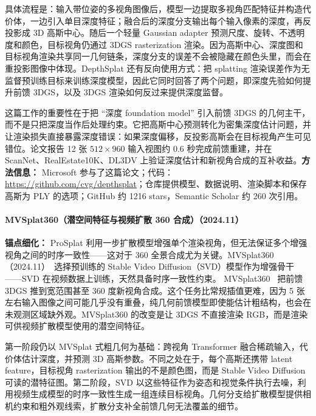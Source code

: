 具体流程是：输入带位姿的多视角图像后，模型一边提取多视角匹配特征并构造代价体，一边引入单目深度特征；融合后的深度分支输出每个输入像素的深度，再反投影成 3D 高斯中心。随后一个轻量 Gaussian adapter 预测尺度、旋转、不透明度和颜色，目标视角仍通过 3DGS rasterization 渲染。因为高斯中心、深度图和目标视角渲染共享同一几何链条，深度分支的误差不会被隐藏在颜色头里，而会在重投影图像中体现。DepthSplat 还有反向使用方式：把 splatting 渲染误差作为无监督预训练目标来训练深度模型，因此它同时回答了两个问题，即深度先验如何提升前馈 3DGS，以及 3DGS 渲染如何反过来提供深度监督。

这篇工作的重要性在于把 ``深度 foundation model'' 引入前馈 3DGS 的几何主干，而不是只把深度当作后处理约束。它把高斯中心预测转化为密集深度估计问题，并让渲染损失直接暴露深度错误：如果深度偏移，反投影高斯会在目标视角产生可见错位。论文报告 12 张 $512\times960$ 输入视图约 0.6 秒完成前馈重建，并在 ScanNet、RealEstate10K、DL3DV 上验证深度估计和新视角合成的互补收益。\textbf{方法信息：} Microsoft 参与了这篇论文；代码：\url{https://github.com/cvg/depthsplat}；仓库提供模型、数据说明、渲染脚本和保存高斯为 PLY 的选项；GitHub 约 1216 stars，Semantic Scholar 约 260 次引用。



\paragraph{MVSplat360（潜空间特征与视频扩散 360 合成）（2024.11）}
\textbf{锚点细化：} ProSplat 利用一步扩散模型增强单个渲染视角，但无法保证多个增强视角之间的时序一致性——这对于 360\textdegree{} 全景合成尤为关键。MVSplat360（2024.11）~\cite{2411_04924}选择预训练的 Stable Video Diffusion（SVD）模型作为增强骨干——SVD 在视频数据上训练，天然具备时序一致性约束。
MVSplat360~\cite{2411_04924} 把前馈 3DGS 推到宽范围甚至 360 度新视角合成。这个任务比常规插值更难，因为 5 张左右输入图像之间可能几乎没有重叠，纯几何前馈模型即使能估计粗结构，也会在未观测区域缺外观。MVSplat360 的改变是让 3DGS 不直接渲染 RGB，而是渲染可供视频扩散模型使用的潜空间特征。

第一阶段仍以 MVSplat 式粗几何为基础：跨视角 Transformer 融合稀疏输入，代价体估计深度，并预测 3D 高斯参数。不同之处在于，每个高斯还携带 latent feature，目标视角 rasterization 输出的不是颜色图，而是 Stable Video Diffusion 可读的潜特征图。第二阶段，SVD 以这些特征作为姿态和视觉条件执行去噪，利用视频生成模型的时序一致性生成一组连续目标视角。几何分支给扩散模型提供相机约束和粗外观线索，扩散分支补全前馈几何无法覆盖的细节。

